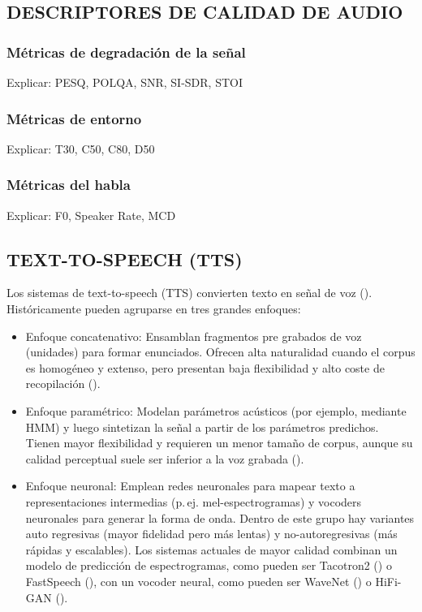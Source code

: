 \subsection{DESCRIPTORES DE CALIDAD DE AUDIO}
\subsubsection{Métricas de degradación de la señal}
Explicar: PESQ, POLQA, SNR, SI-SDR, STOI

\subsubsection{Métricas de entorno}
Explicar: T30, C50, C80, D50

\subsubsection{Métricas del habla}
Explicar: F0, Speaker Rate, MCD 

\subsection{TEXT-TO-SPEECH (TTS)}
Los sistemas de text-to-speech (TTS) convierten texto en señal de voz (\cite{survey1}).
Históricamente pueden agruparse en tres grandes enfoques:

\begin{itemize}
    \item Enfoque concatenativo: Ensamblan fragmentos pre grabados de voz (unidades) para formar enunciados. Ofrecen alta naturalidad cuando el corpus es homogéneo y extenso, pero presentan baja flexibilidad y alto coste de recopilación (\cite{concatenative}).
    \item Enfoque paramétrico: Modelan parámetros acústicos (por ejemplo, mediante HMM) y luego sintetizan la señal a partir de los parámetros predichos. Tienen mayor flexibilidad y requieren un menor tamaño de corpus, aunque su calidad perceptual suele ser inferior a la voz grabada (\cite{parametrico}).
    \item Enfoque neuronal: Emplean redes neuronales para mapear texto a representaciones intermedias (p.\,ej. mel-espectrogramas) y vocoders neuronales para generar la forma de onda. Dentro de este grupo hay variantes auto regresivas (mayor fidelidad pero más lentas) y no-autoregresivas (más rápidas y escalables). Los sistemas actuales de mayor calidad combinan un modelo de predicción de espectrogramas, como pueden ser Tacotron2 (\cite{tacotron}) o FastSpeech (\cite{fastspeech}), con un vocoder neural, como pueden ser WaveNet (\cite{wavenet}) o HiFi-GAN (\cite{hifigan}). 
\end{itemize}

